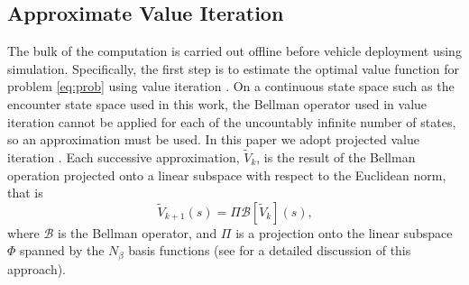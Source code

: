 \subsection{Approximate Value Iteration} \label{sec:iter}

The bulk of the computation is carried out offline before vehicle deployment using simulation. Specifically, the first step is to estimate the optimal value function for problem \eqref{eq:prob} using value iteration \cite{DB:05}. On a continuous state space such as the encounter state space used in this work, the Bellman operator used in value iteration cannot be applied for each of the uncountably infinite number of states, so an approximation must be used. In this paper we adopt projected value iteration \cite{DB:05}. Each successive approximation, $\tilde{V}_k$, is the result of the Bellman operation projected onto a linear subspace with respect to the Euclidean norm, that is
\begin{equation}\label{eqn:projvi}
    \tilde{V}_{k+1}(s) = \Pi \mathcal{B}[\tilde{V}_k](s) \text{,}
\end{equation}
where $\mathcal{B}$ is the Bellman operator, and $\Pi$ is a projection onto the linear subspace $\Phi$ spanned by the $N_\beta$ basis functions (see \cite{DB:05} for a detailed discussion of this approach).

